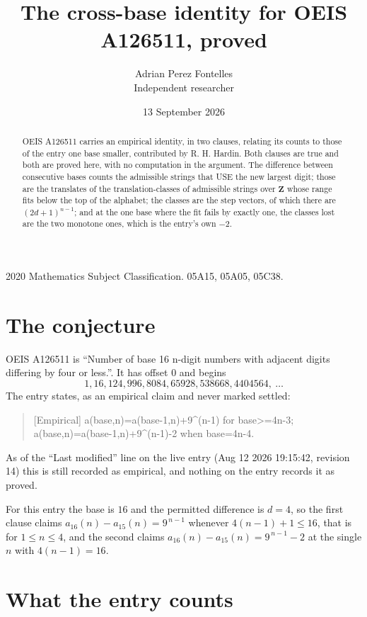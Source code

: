 \documentclass[11pt,a4paper]{article}
\title{The cross-base identity for OEIS A126511, proved}
\author{Adrian Perez Fontelles\\ \small Independent researcher}
\date{13 September 2026}
\theoremstyle{plain}
\theoremstyle{definition}
\begin{document}
\maketitle

\begin{abstract}
OEIS A126511 carries an empirical identity, in two clauses, relating its counts to those of the
entry one base smaller, contributed by R. H. Hardin. Both clauses are true and both are proved
here, with no computation in the argument. The difference between consecutive bases counts the
admissible strings that USE the new largest digit; those are the translates of the
translation-classes of admissible strings over $\mathbf{Z}$ whose range fits below the top of
the alphabet; the classes are the step vectors, of which there are $(2d+1)^{n-1}$; and at the
one base where the fit fails by exactly one, the classes lost are the two monotone ones, which
is the entry's own $-2$.
\end{abstract}

\noindent\small 2020 Mathematics Subject Classification. 05A15, 05A05, 05C38.\normalsize

\section{The conjecture}

OEIS A126511 is ``Number of base 16 n-digit numbers with adjacent digits differing by four or less.''. It has offset $0$ and begins
\[
1, 16, 124, 996, 8084, 65928, 538668, 4404564,\ \dots
\]
The entry states, as an empirical claim and never marked settled:
\begin{quote}
[Empirical] a(base,n)=a(base-1,n)+9\textasciicircum{}(n-1) for base>=4n-3; a(base,n)=a(base-1,n)+9\textasciicircum{}(n-1)-2 when base=4n-4.
\end{quote}
As of the ``Last modified'' line on the live entry (Aug 12 2026 19:15:42, revision 14)
this is still recorded as empirical, and nothing on the entry records it as proved.

For this entry the base is $16$ and the permitted difference is $d=4$, so the first clause
claims $a_{16}(n)-a_{15}(n)=9^{\,n-1}$ whenever $4(n-1)+1\le16$, that is for
$1\le n\le4$, and the second claims $a_{16}(n)-a_{15}(n)=9^{\,n-1}-2$ at the single
$n$ with $4(n-1)=16$.

\section{What the entry counts}
\end{document}
